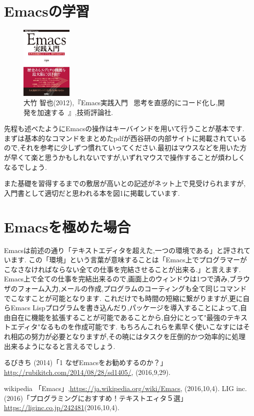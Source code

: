 \documentclass[a4j,twocolumn,uplatex]{jarticle}
\begin{document}
\vspace{-4mm}
\section{Emacsの学習}
\begin{figure}
\begin{center}
\includegraphics[width=25mm,clip]{Emacs_zissen_nyuumonn.png}
\caption{大竹 智也(2012),『Emacs実践入門 ~思考を直感的にコード化し,開発を加速する~』,技術評論社.}
\label{fig:kite1}
\end{center}
\end{figure}
先程も述べたようにEmacsの操作はキーバインドを用いて行うことが基本です. まずは基本的なコマンドをまとめたpdfが西谷研の内部サイトに掲載されているので,それを参考に少しずつ慣れていってください.最初はマウスなどを用いた方が早くて楽と思うかもしれないですが,いずれマウスで操作することが煩わしくなるでしょう. 

また基礎を習得するまでの敷居が高いとの記述がネット上で見受けられますが,
入門書として適切だと思われる本を図1に掲載しています.
\vspace{6mm}



\section{Emacsを極めた場合}
Emacsは前述の通り「テキストエディタを超えた,一つの環境である」と評されています. この「環境」という言葉が意味することは「Emacs上でプログラマーがこなさなければならない全ての仕事を完結させることが出来る.」と言えます.
Emacs上で全ての仕事を完結出来るので,画面上のウィンドウは1つで済み,ブラウザのフォーム入力,メールの作成,プログラムのコーティングも全て同じコマンドでこなすことが可能となります.
これだけでも時間の短縮に繋がりますが,更に自らEmacs Lispプログラムを書き込んだり,パッケージを導入することによって,自由自在に機能を拡張することが可能であることから,自分にとって"最強のテキストエディタ"なるものを作成可能です. もちろんこれらを素早く使いこなすにはそれ相応の努力が必要となりますが,その暁にはタスクを圧倒的かつ効率的に処理出来るようになると言えるでしょう.


\vspace{-4mm}
\begin{thebibliography}{9}

 るびきち (2014)「1 なぜEmacsをお勧めするのか？」\url{http://rubikitch.com/2014/08/28/sd1405/}, (2016,9,29).

 wikipedia 「Emacs」,\url{https://ja.wikipedia.org/wiki/Emacs}, (2016,10,4).
 LIG inc.(2016)「プログラミングにおすすめ！テキストエィタ５選」\url{https://liginc.co.jp/242481}(2016,10,4).






\end{thebibliography}
\end{document}
